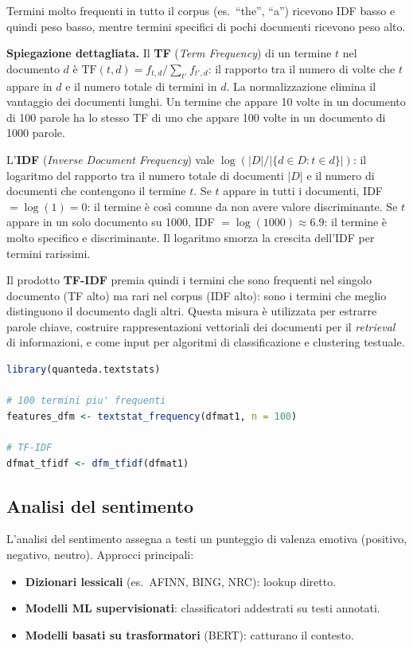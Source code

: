 \documentclass[12pt,a4paper]{article}
\begin{document}
Termini molto frequenti in tutto il corpus (es.\ ``the'', ``a'') ricevono
IDF basso e quindi peso basso, mentre termini specifici di pochi documenti
ricevono peso alto.

\medskip
\noindent\textbf{Spiegazione dettagliata.}
Il \textbf{TF} (\textit{Term Frequency}) di un termine $t$ nel documento $d$ è
$\text{TF}(t,d) = f_{t,d} / \sum_{t'} f_{t',d}$: il rapporto tra il numero di volte
che $t$ appare in $d$ e il numero totale di termini in $d$. La normalizzazione elimina
il vantaggio dei documenti lunghi. Un termine che appare 10 volte in un documento di
100 parole ha lo stesso TF di uno che appare 100 volte in un documento di 1000 parole.

L'\textbf{IDF} (\textit{Inverse Document Frequency}) vale $\log(|D| / |\{d \in D : t \in d\}|)$:
il logaritmo del rapporto tra il numero totale di documenti $|D|$ e il numero di documenti
che contengono il termine $t$. Se $t$ appare in tutti i documenti, IDF $= \log(1) = 0$:
il termine è così comune da non avere valore discriminante. Se $t$ appare in un solo
documento su 1000, IDF $= \log(1000) \approx 6.9$: il termine è molto specifico e
discriminante. Il logaritmo smorza la crescita dell'IDF per termini rarissimi.

Il prodotto \textbf{TF-IDF} premia quindi i termini che sono frequenti nel singolo documento
(TF alto) ma rari nel corpus (IDF alto): sono i termini che meglio distinguono il documento
dagli altri. Questa misura è utilizzata per estrarre parole chiave, costruire rappresentazioni
vettoriali dei documenti per il \textit{retrieval} di informazioni, e come input per
algoritmi di classificazione e clustering testuale.

\begin{lstlisting}[language=R]
library(quanteda.textstats)

# 100 termini piu' frequenti
features_dfm <- textstat_frequency(dfmat1, n = 100)

# TF-IDF
dfmat_tfidf <- dfm_tfidf(dfmat1)
\end{lstlisting}

\subsection{Analisi del sentimento}

L'analisi del sentimento assegna a testi un punteggio di valenza emotiva (positivo,
negativo, neutro). Approcci principali:
\begin{itemize}
  \item \textbf{Dizionari lessicali} (es.\ AFINN, BING, NRC): lookup diretto.
  \item \textbf{Modelli ML supervisionati}: classificatori addestrati su testi annotati.
  \item \textbf{Modelli basati su trasformatori} (BERT): catturano il contesto.
\end{itemize}
\end{document}
